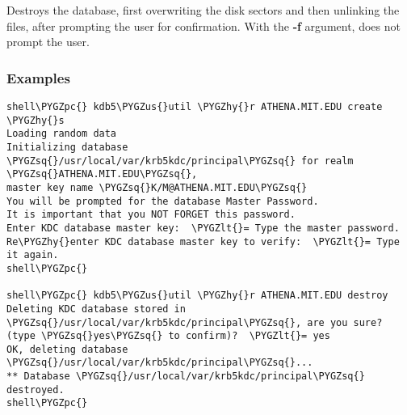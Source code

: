 \documentclass[letterpaper,10pt,english]{sphinxmanual}
\def\PYGZus{\char`\_}
\def\PYGZlt{\char`\<}
\def\PYGZpc{\char`\%}
\def\PYGZhy{\char`\-}
\def\PYGZsq{\char`\'}
\begin{document}
Destroys the database, first overwriting the disk sectors and then
unlinking the files, after prompting the user for confirmation.  With
the \textbf{-f} argument, does not prompt the user.


\subsubsection{Examples}
\label{admin/database:id5}
\begin{Verbatim}[commandchars=\\\{\}]
shell\PYGZpc{} kdb5\PYGZus{}util \PYGZhy{}r ATHENA.MIT.EDU create \PYGZhy{}s
Loading random data
Initializing database \PYGZsq{}/usr/local/var/krb5kdc/principal\PYGZsq{} for realm \PYGZsq{}ATHENA.MIT.EDU\PYGZsq{},
master key name \PYGZsq{}K/M@ATHENA.MIT.EDU\PYGZsq{}
You will be prompted for the database Master Password.
It is important that you NOT FORGET this password.
Enter KDC database master key:  \PYGZlt{}= Type the master password.
Re\PYGZhy{}enter KDC database master key to verify:  \PYGZlt{}= Type it again.
shell\PYGZpc{}

shell\PYGZpc{} kdb5\PYGZus{}util \PYGZhy{}r ATHENA.MIT.EDU destroy
Deleting KDC database stored in \PYGZsq{}/usr/local/var/krb5kdc/principal\PYGZsq{}, are you sure?
(type \PYGZsq{}yes\PYGZsq{} to confirm)?  \PYGZlt{}= yes
OK, deleting database \PYGZsq{}/usr/local/var/krb5kdc/principal\PYGZsq{}...
** Database \PYGZsq{}/usr/local/var/krb5kdc/principal\PYGZsq{} destroyed.
shell\PYGZpc{}
\end{Verbatim}
\end{document}

